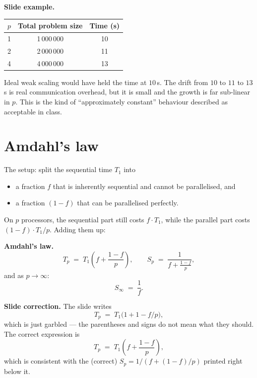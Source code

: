 \begin{ppexample}
\textbf{Slide example.}
\begin{center}
\begin{tabular}{@{}ccc@{}}
\toprule
$p$ & Total problem size & Time (s) \\ \midrule
1  & 1\,000\,000 & 10 \\
2  & 2\,000\,000 & 11 \\
4  & 4\,000\,000 & 13 \\ \bottomrule
\end{tabular}
\end{center}
Ideal weak scaling would have held the time at $10$\,s. The drift from $10$
to $11$ to $13$\,s is real communication overhead, but it is small and the
growth is far sub-linear in $p$. This is the kind of ``approximately
constant'' behaviour described as acceptable in class.
\end{ppexample}

\section{Amdahl's law}

The setup: split the sequential time $T_1$ into
\begin{itemize}
  \item a fraction $f$ that is inherently sequential and cannot be parallelised, and
  \item a fraction $(1-f)$ that can be parallelised perfectly.
\end{itemize}

On $p$ processors, the sequential part still costs $f \cdot T_1$, while the
parallel part costs $(1-f)\cdot T_1 / p$. Adding them up:

\begin{ppdefn}
\textbf{Amdahl's law.}
\[
T_p \;=\; T_1\!\left(f + \frac{1-f}{p}\right),
\qquad
S_p \;=\; \dfrac{1}{f + \tfrac{1-f}{p}},
\]
and as $p \to \infty$:
\[
S_{\infty} \;=\; \frac{1}{f}.
\]
\end{ppdefn}

\begin{pppitfall}
\textbf{Slide correction.} The slide writes
\[
T_p \;=\; T_1\bigl(1 + 1 - f/p\bigr),
\]
which is just garbled --- the parentheses and signs do not mean what they
should. The correct expression is
\[
T_p \;=\; T_1\!\left(f + \frac{1-f}{p}\right),
\]
which is consistent with the (correct) $S_p = 1/(f + (1-f)/p)$ printed
right below it.
\end{pppitfall}

